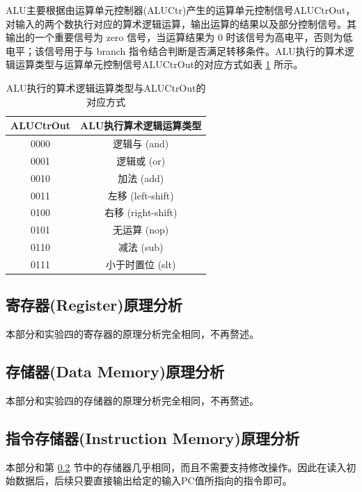 \documentclass{cumcm}
\numberwithin{equation}{section}
\numberwithin{equation}{subsection}
\begin{document}
ALU主要根据由运算单元控制器(ALUCtr)产生的运算单元控制信号ALUCtrOut，对输入的两个数执行对应的算术逻辑运算，输出运算的结果以及部分控制信号。其输出的一个重要信号为 zero 信号，当运算结果为 0 时该信号为高电平，否则为低电平；该信号用于与 branch 指令结合判断是否满足转移条件。ALU执行的算术逻辑运算类型与运算单元控制信号ALUCtrOut的对应方式如表 \ref{tab4} 所示。

\begin{table}[htbp]
    \centering
    \begin{tabular}{|c|c|}
         \hline
         ALUCtrOut & ALU执行算术逻辑运算类型 \\
         \hline
         0000 & 逻辑与 (and) \\
         0001 & 逻辑或 (or) \\
         0010 & 加法 (add) \\
         0011 & 左移 (left-shift) \\
         0100 & 右移 (right-shift) \\
         0101 & 无运算 (nop) \\
         0110 & 减法 (sub) \\
         0111 & 小于时置位 (slt) \\
         \hline
    \end{tabular}
    \caption{ALU执行的算术逻辑运算类型与ALUCtrOut的对应方式}
    \label{tab4}
\end{table}

\subsection{寄存器(Register)原理分析}\label{section2.4}

本部分和实验四的寄存器的原理分析完全相同，不再赘述。

\subsection{存储器(Data Memory)原理分析}\label{section2.5}

本部分和实验四的存储器的原理分析完全相同，不再赘述。

\subsection{指令存储器(Instruction Memory)原理分析}\label{section2.6}

本部分和第 \ref{section2.5} 节中的存储器几乎相同，而且不需要支持修改操作。因此在读入初始数据后，后续只要直接输出给定的输入PC值所指向的指令即可。
\end{document}
